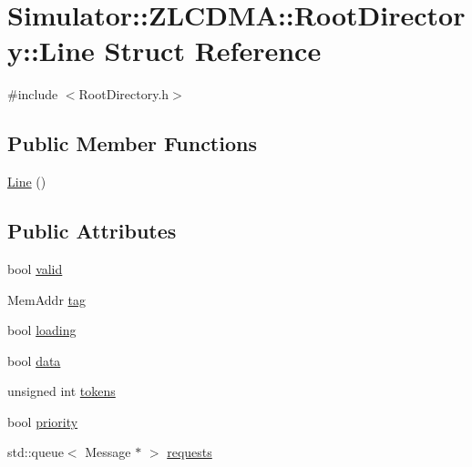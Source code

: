 \hypertarget{struct_simulator_1_1_z_l_c_d_m_a_1_1_root_directory_1_1_line}{\section{Simulator\+:\+:Z\+L\+C\+D\+M\+A\+:\+:Root\+Directory\+:\+:Line Struct Reference}
\label{struct_simulator_1_1_z_l_c_d_m_a_1_1_root_directory_1_1_line}
}


{\ttfamily \#include $<$Root\+Directory.\+h$>$}

\subsection*{Public Member Functions}
\begin{DoxyCompactItemize}
\item 
\hyperlink{struct_simulator_1_1_z_l_c_d_m_a_1_1_root_directory_1_1_line_ad92a8f5df5590dfaed9d1f1336f0174e}{Line} ()
\end{DoxyCompactItemize}
\subsection*{Public Attributes}
\begin{DoxyCompactItemize}
\item 
bool \hyperlink{struct_simulator_1_1_z_l_c_d_m_a_1_1_root_directory_1_1_line_a166dbe3aef73ba2c8ec4161c423fc458}{valid}
\item 
Mem\+Addr \hyperlink{struct_simulator_1_1_z_l_c_d_m_a_1_1_root_directory_1_1_line_a70980f386c2678942306f2275d34e094}{tag}
\item 
bool \hyperlink{struct_simulator_1_1_z_l_c_d_m_a_1_1_root_directory_1_1_line_af11addaae8c8b2a4c937845a71f4edc6}{loading}
\item 
bool \hyperlink{struct_simulator_1_1_z_l_c_d_m_a_1_1_root_directory_1_1_line_aa9062aaf1af0368b7063ff050c6c287f}{data}
\item 
unsigned int \hyperlink{struct_simulator_1_1_z_l_c_d_m_a_1_1_root_directory_1_1_line_a392fe8f575561129fb49ca24e8883c12}{tokens}
\item 
bool \hyperlink{struct_simulator_1_1_z_l_c_d_m_a_1_1_root_directory_1_1_line_a6f85a5e5835b7789cac0504a37be98a2}{priority}
\item 
std\+::queue$<$ Message $\ast$ $>$ \hyperlink{struct_simulator_1_1_z_l_c_d_m_a_1_1_root_directory_1_1_line_a67a444aab4fa81c551d88e0af510ba8e}{requests}
\end{DoxyCompactItemize}


